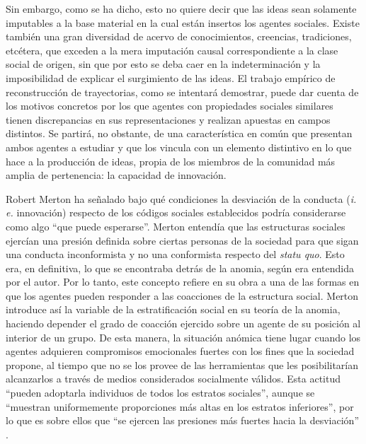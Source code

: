 Sin embargo, como se ha dicho, esto no quiere decir que las ideas sean solamente imputables a la base material en la cual están insertos los agentes sociales. Existe también una gran diversidad de acervo de conocimientos, creencias, tradiciones, etcétera, que exceden a la mera imputación causal correspondiente a la clase social de origen, sin que por esto se deba caer en la indeterminación y la imposibilidad de explicar el surgimiento de las ideas. El trabajo empírico de reconstrucción de trayectorias, como se intentará demostrar, puede dar cuenta de los motivos concretos por los que agentes con propiedades sociales similares tienen discrepancias en sus representaciones y realizan apuestas en campos distintos. Se partirá, no obstante, de una característica en común que presentan ambos agentes a estudiar y que los vincula con un elemento distintivo en lo que hace a la producción de ideas, propia de los miembros de la comunidad más amplia de pertenencia: la capacidad de innovación.

Robert Merton ha señalado bajo qué condiciones la desviación de la conducta (\emph{i. e.} innovación) respecto de los códigos sociales establecidos podría considerarse como algo \enquote{que puede esperarse}. Merton entendía que las estructuras sociales ejercían una presión definida sobre ciertas personas de la sociedad para que sigan una conducta inconformista y no una conformista respecto del \emph{statu quo}. Esto era, en definitiva, lo que se encontraba detrás de la anomia, según era entendida por el autor. Por lo tanto, este concepto refiere en su obra a una de las formas en que los agentes pueden responder a las coacciones de la estructura social. Merton introduce así la variable de la estratificación social en su teoría de la anomia, haciendo depender el grado de coacción ejercido sobre un agente de su posición al interior de un grupo. De esta manera, la situación anómica tiene lugar cuando los agentes adquieren compromisos emocionales fuertes con los fines que la sociedad propone, al tiempo que no se los provee de las herramientas que les posibilitarían alcanzarlos a través de medios considerados socialmente válidos. Esta actitud \enquote{pueden adoptarla individuos de todos los estratos sociales}, aunque se \enquote{muestran uniformemente proporciones más altas en los estratos inferiores}, por lo que es sobre ellos que \enquote{se ejercen las presiones más fuertes hacia la desviación} \parencite[223]{1705-MERTON2002}.

